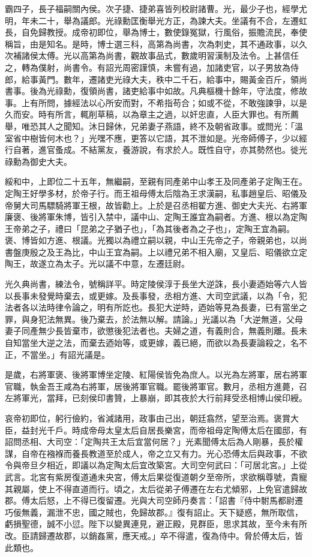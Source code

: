 \begin{pinyinscope}
霸四子，長子福嗣關內侯。次子捷、捷弟喜皆列校尉諸曹。光，最少子也，經學尤明，年未二十，舉為議郎。光祿勳匡衡舉光方正，為諫大夫。坐議有不合，左遷虹長，自免歸教授。成帝初即位，舉為博士，數使錄冤獄，行風俗，振贍流民，奉使稱旨，由是知名。是時，博士選三科，高第為尚書，次為刺史，其不通政事，以久次補諸侯太傅。光以高第為尚書，觀故事品式，數歲明習漢制及法令。上甚信任之，轉為僕射，尚書令。有詔光周密謹慎，未嘗有過，加諸吏官，以子男放為侍郎，給事黃門。數年，遷諸吏光祿大夫，秩中二千石，給事中，賜黃金百斤，領尚書事。後為光祿勳，復領尚書，諸吏給事中如故。凡典樞機十餘年，守法度，修故事。上有所問，據經法以心所安而對，不希指苟合；如或不從，不敢強諫爭，以是久而安。時有所言，輒削草稿，以為章主之過，以奸忠直，人臣大罪也。有所薦舉，唯恐其人之聞知。沐日歸休，兄弟妻子燕語，終不及朝省政事。或問光：「溫室省中樹皆何木也？」光嘿不應，更答以它語，其不泄如是。光帝師傅子，少以經行自著，進官蚤成。不結黨友，養游說，有求於人。既性自守，亦其勢然也。徙光祿勳為御史大夫。

綏和中，上即位二十五年，無繼嗣，至親有同產弟中山孝王及同產弟子定陶王在。定陶王好學多材，於帝子行。而王祖母傅太后陰為王求漢嗣，私事趙皇后、昭儀及帝舅大司馬驃騎將軍王根，故皆勸上。上於是召丞相翟方進、御史大夫光、右將軍廉褒、後將軍朱博，皆引入禁中，議中山、定陶王誰宜為嗣者。方進、根以為定陶王帝弟之子，禮曰「昆弟之子猶子也」，「為其後者為之子也」，定陶王宜為嗣。褒、博皆如方進、根議。光獨以為禮立嗣以親，中山王先帝之子，帝親弟也，以尚書盤庚殷之及王為比，中山王宜為嗣。上以禮兄弟不相入廟，又皇后、昭儀欲立定陶王，故遂立為太子。光以議不中意，左遷廷尉。

光久典尚書，練法令，號稱詳平。時定陵侯淳于長坐大逆誅，長小妻迺始等六人皆以長事未發覺時棄去，或更嫁。及長事發，丞相方進、大司空武議，以為「令，犯法者各以法時律令論之，明有所訖也。長犯大逆時，迺始等見為長妻，已有當坐之罪，與身犯法無異。後乃棄去，於法無以解。請論。」光議以為「大逆無道，父母妻子同產無少長皆棄市，欲懲後犯法者也。夫婦之道，有義則合，無義則離。長未自知當坐大逆之法，而棄去迺始等，或更嫁，義已絕，而欲以為長妻論殺之，名不正，不當坐。」有詔光議是。

是歲，右將軍褒、後將軍博坐定陵、紅陽侯皆免為庶人。以光為左將軍，居右將軍官職，執金吾王咸為右將軍，居後將軍官職。罷後將軍官。數月，丞相方進薨，召左將軍光，當拜，已刻侯印書贊，上暴崩，即其夜於大行前拜受丞相博山侯印綬。

哀帝初即位，躬行儉約，省減諸用，政事由己出，朝廷翕然，望至治焉。褒賞大臣，益封光千戶。時成帝母太皇太后自居長樂宮，而帝祖母定陶傅太后在國邸，有詔問丞相、大司空：「定陶共王太后宜當何居？」光素聞傅太后為人剛暴，長於權謀，自帝在襁褓而養長教道至於成人，帝之立又有力。光心恐傅太后與政事，不欲令與帝旦夕相近，即議以為定陶太后宜改築宮。大司空何武曰：「可居北宮。」上從武言。北宮有紫房復道通未央宮，傅太后果從復道朝夕至帝所，求欲稱尊號，貴寵其親屬，使上不得直道而行。頃之，太后從弟子傅遷在左右尤傾邪，上免官遣歸故郡。傅太后怒，上不得已復留遷。光與大司空師丹奏言：「詔書『侍中駙馬都尉遷巧佞無義，漏泄不忠，國之賊也，免歸故郡。』復有詔止。天下疑惑，無所取信，虧損聖德，誠不小愆。陛下以變異連見，避正殿，見群臣，思求其故，至今未有所改。臣請歸遷故郡，以銷姦黨，應天戒。」卒不得遣，復為侍中。脅於傅太后，皆此類也。


\end{pinyinscope}
